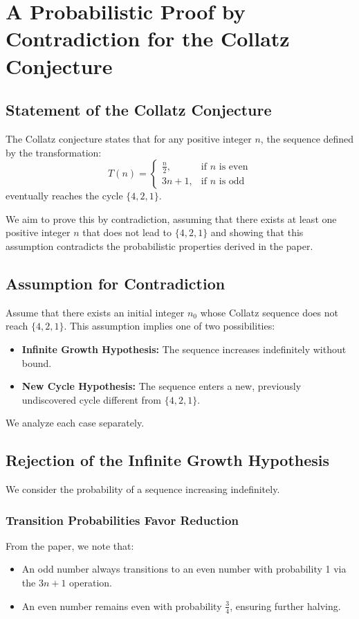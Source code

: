 \section{A Probabilistic Proof by Contradiction for the Collatz Conjecture}

\subsection{Statement of the Collatz Conjecture}
The Collatz conjecture states that for any positive integer \( n \), the sequence defined by the transformation:
\[
T(n) = 
\begin{cases} 
\frac{n}{2}, & \text{if } n \text{ is even} \\
3n + 1, & \text{if } n \text{ is odd}
\end{cases}
\]
eventually reaches the cycle \(\{4, 2, 1\}\).

We aim to prove this by contradiction, assuming that there exists at least one positive integer \( n \) that does not lead to \(\{4, 2, 1\}\) and showing that this assumption contradicts the probabilistic properties derived in the paper.

\subsection{Assumption for Contradiction}
Assume that there exists an initial integer \( n_0 \) whose Collatz sequence does not reach \(\{4, 2, 1\}\). This assumption implies one of two possibilities:
\begin{itemize}
    \item \textbf{Infinite Growth Hypothesis:} The sequence increases indefinitely without bound.
    \item \textbf{New Cycle Hypothesis:} The sequence enters a new, previously undiscovered cycle different from \(\{4, 2, 1\}\).
\end{itemize}
We analyze each case separately.

\subsection{Rejection of the Infinite Growth Hypothesis}
We consider the probability of a sequence increasing indefinitely.

\subsubsection{Transition Probabilities Favor Reduction}
From the paper, we note that:
\begin{itemize}
    \item An odd number always transitions to an even number with probability 1 via the \(3n + 1\) operation.
    \item An even number remains even with probability \(\frac{3}{4}\), ensuring further halving.
\end{itemize}

